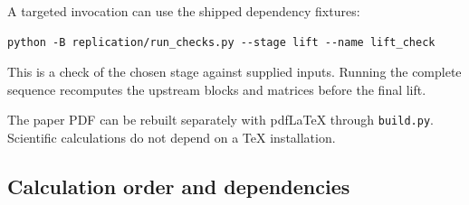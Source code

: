 A targeted invocation can use the shipped dependency fixtures:
\begin{Verbatim}[fontsize=\small]
python -B replication/run_checks.py --stage lift --name lift_check
\end{Verbatim}
This is a check of the chosen stage against supplied inputs. Running the complete sequence recomputes the upstream blocks and matrices before the final lift.

The paper PDF can be rebuilt separately with pdfLaTeX through \texttt{build.py}. Scientific calculations do not depend on a TeX installation.

\subsection{Calculation order and dependencies}

